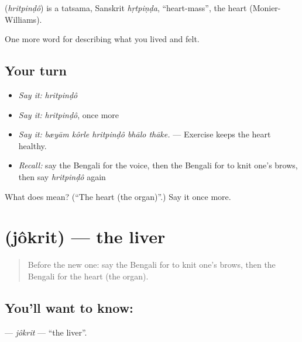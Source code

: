 \begin{cousinweb}
\textbf{} (\emph{hritpinḍô}) is a tatsama, Sanskrit \emph{hṛtpiṇḍa}, \textquotedblleft{}heart-mass\textquotedblright{}, the heart (Monier-Williams).
\end{cousinweb}

\begin{grammarlens}[title={What you've built}]
One more word for describing what you lived and felt.
\end{grammarlens}

\subsection*{Your turn}
\begin{itemize}
\raggedright
  \item \emph{Say it:} \emph{hritpinḍô}
  \item \emph{Say it:} \emph{hritpinḍô}, once more
  \item \emph{Say it:} \emph{bæyām kôrle hritpinḍô bhālo thāke.} — Exercise keeps the heart healthy.
  \item \emph{Recall:} say the Bengali for the voice, then the Bengali for to knit one's brows, then say \emph{hritpinḍô} again
\end{itemize}

\begin{tcolorbox}[breakable,colback=teal!4,colframe=teal!35!black,title={Before you move on}]
What does  mean? (\textquotedblleft{}The heart (the organ)\textquotedblright{}.) Say it once more.
\end{tcolorbox}
\section[\texorpdfstring{\bn{যকৃৎ} (jôkrit)}{যকৃৎ (jôkrit)}]{ (jôkrit) — the liver}

\label{lesson:BN-C468-jokrit}



\begin{quote}
Before the new one: say the Bengali for to knit one's brows, then the Bengali for the heart (the organ).
\end{quote}

\subsection*{You'll want to know: }
\textbf{} — \emph{jôkrit} — \textquotedblleft{}the liver\textquotedblright{}.

